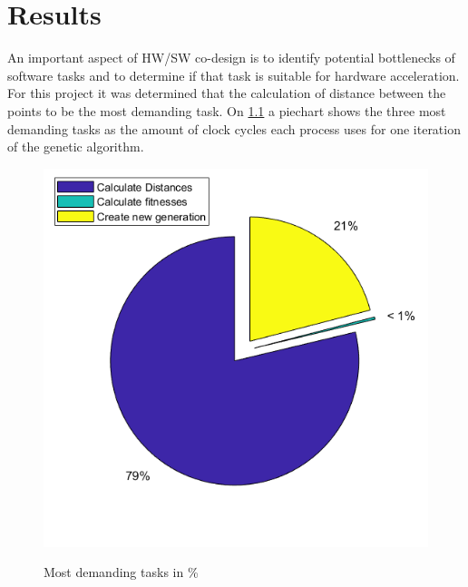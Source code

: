 
\chapter{Results}
An important aspect of HW/SW co-design is to identify potential bottlenecks of software tasks and to determine if that task is suitable for hardware acceleration. For this project it was determined that the calculation of distance between the points to be the most demanding task. On \cref{fig:timing_pie} a piechart shows the three most demanding tasks as the amount of clock cycles each process uses for one iteration of the genetic algorithm. 

\begin{figure}[H]
	\centering
	{\includegraphics[width=\textwidth]{Images/timing_pieChart.png}}\\[0.5cm]
	\caption{Most demanding tasks in \%}
	\label{fig:timing_pie}
\end{figure}





